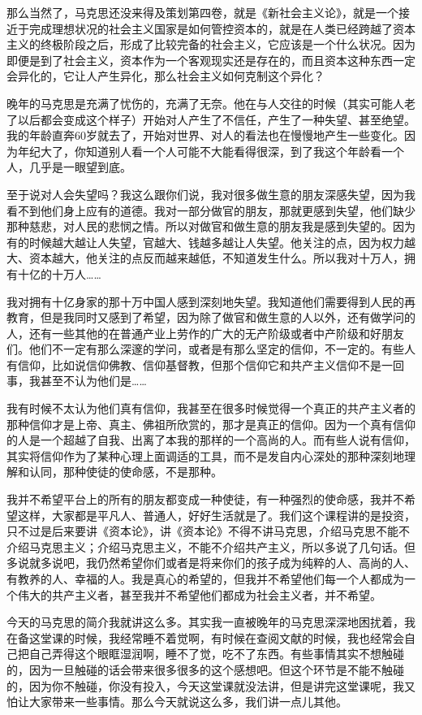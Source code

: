 \documentclass[UTF8, 12pt, a4paper]{ctexrep}
\begin{document}
那么当然了，马克思还没来得及策划第四卷，就是《新社会主义论》，就是一个接近于完成理想状况的社会主义国家是如何管控资本的，就是在人类已经跨越了资本主义的终极阶段之后，形成了比较完备的社会主义，它应该是一个什么状况。因为即便是到了社会主义，资本作为一个客观现实还是存在的，而且资本这种东西一定会异化的，它让人产生异化，那么社会主义如何克制这个异化？

晚年的马克思是充满了忧伤的，充满了无奈。他在与人交往的时候（其实可能人老了以后都会变成这个样子）开始对人产生了不信任，产生了一种失望、甚至绝望。我的年龄直奔60岁就去了，开始对世界、对人的看法也在慢慢地产生一些变化。因为年纪大了，你知道别人看一个人可能不大能看得很深，到了我这个年龄看一个人，几乎是一眼望到底。

至于说对人会失望吗？我这么跟你们说，我对很多做生意的朋友深感失望，因为我看不到他们身上应有的道德。我对一部分做官的朋友，那就更感到失望，他们缺少那种慈悲，对人民的悲悯之情。所以对做官和做生意的朋友我是感到失望的。因为有的时候越大越让人失望，官越大、钱越多越让人失望。他关注的点，因为权力越大、资本越大，他关注的点反而越来越低，不知道发生什么。所以我对十万人，拥有十亿的十万人……

我对拥有十亿身家的那十万中国人感到深刻地失望。我知道他们需要得到人民的再教育，但是我同时又感到了希望，因为除了做官和做生意的人以外，还有做学问的人，还有一些其他的在普通产业上劳作的广大的无产阶级或者中产阶级和好朋友们。他们不一定有那么深邃的学问，或者是有那么坚定的信仰，不一定的。有些人有信仰，比如说信仰佛教、信仰基督教，但那个信仰它和共产主义信仰不是一回事，我甚至不认为他们是……

我有时候不太认为他们真有信仰，我甚至在很多时候觉得一个真正的共产主义者的那种信仰才是上帝、真主、佛祖所欣赏的，那才是真正的信仰。因为一个真有信仰的人是一个超越了自我、出离了本我的那样的一个高尚的人。而有些人说有信仰，其实将信仰作为了某种心理上面调适的工具，而不是发自内心深处的那种深刻地理解和认同，那种使徒的使命感，不是那种。

我并不希望平台上的所有的朋友都变成一种使徒，有一种强烈的使命感，我并不希望这样，大家都是平凡人、普通人，好好生活就是了。我们这个课程讲的是投资，只不过是后来要讲《资本论》，讲《资本论》不得不讲马克思，介绍马克思不能不介绍马克思主义；介绍马克思主义，不能不介绍共产主义，所以多说了几句话。但多说就多说吧，我仍然希望你们或者是将来你们的孩子成为纯粹的人、高尚的人、有教养的人、幸福的人。我是真心的希望的，但我并不希望他们每一个人都成为一个伟大的共产主义者，甚至我并不希望他们都成为社会主义者，并不希望。

今天的马克思的简介我就讲这么多。其实我一直被晚年的马克思深深地困扰着，我在备这堂课的时候，我经常睡不着觉啊，有时候在查阅文献的时候，我也经常会自己把自己弄得这个眼眶湿润啊，睡不了觉，吃不了东西。有些事情其实不想触碰的，因为一旦触碰的话会带来很多很多的这个感想吧。但这个环节是不能不触碰的，因为你不触碰，你没有投入，今天这堂课就没法讲，但是讲完这堂课呢，我又怕让大家带来一些事情。那么今天就说这么多，我们讲一点儿其他。
\end{document}

